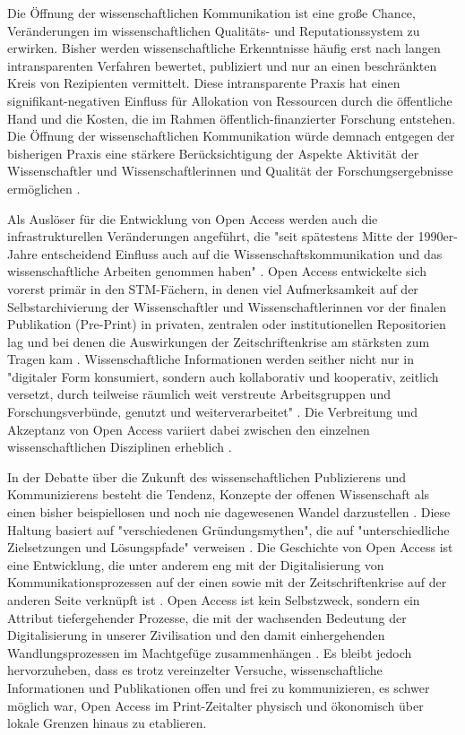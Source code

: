 Die Öffnung der wissenschaftlichen Kommunikation ist eine große Chance, Veränderungen im wissenschaftlichen Qualitäts- und Reputationssystem zu erwirken. Bisher werden wissenschaftliche Erkenntnisse häufig erst nach langen intransparenten Verfahren bewertet, publiziert und nur an einen beschränkten Kreis von Rezipienten vermittelt. Diese intransparente Praxis hat einen signifikant-negativen Einfluss für Allokation von Ressourcen durch die öffentliche Hand und die Kosten, die im Rahmen öffentlich-finanzierter Forschung entstehen. Die Öffnung der wissenschaftlichen Kommunikation würde demnach entgegen der bisherigen Praxis eine stärkere Berücksichtigung der Aspekte Aktivität der Wissenschaftler und Wissenschaftlerinnen und Qualität der Forschungsergebnisse ermöglichen \cite{Heise_2012b}.

Als Auslöser für die Entwicklung von Open Access werden auch die infrastrukturellen Veränderungen angeführt, die "seit spätestens Mitte der 1990er-Jahre entscheidend Einfluss auch auf die Wissenschaftskommunikation und das wissenschaftliche Arbeiten genommen haben" \cite{Schulze_2013}. Open Access entwickelte sich vorerst primär in den STM-Fächern, in denen viel Aufmerksamkeit auf der Selbstarchivierung der Wissenschaftler und Wissenschaftlerinnen vor der finalen Publikation (Pre-Print) in privaten, zentralen oder institutionellen Repositorien lag \cite{Adema_2013} und bei denen die Auswirkungen der Zeitschriftenkrise am stärksten zum Tragen kam \cite{Naeder_2010}. Wissenschaftliche Informationen werden seither nicht nur in "digitaler Form konsumiert, sondern auch kollaborativ und kooperativ, zeitlich versetzt, durch teilweise räumlich weit verstreute Arbeitsgruppen und Forschungsverbünde, genutzt und weiterverarbeitet" \cite{Schulze_2013}. Die Verbreitung und Akzeptanz von Open Access variiert dabei zwischen den einzelnen wissenschaftlichen Disziplinen erheblich \cite{Bernius_2009}.

In der Debatte über die Zukunft des wissenschaftlichen Publizierens und Kommunizierens besteht die Tendenz, Konzepte der offenen Wissenschaft als einen bisher beispiellosen und noch nie dagewesenen Wandel darzustellen \cite{Naeder_2010} \cite{Bjoerk_2010}. Diese Haltung basiert auf "verschiedenen Gründungsmythen", die auf "unterschiedliche Zielsetzungen und Lösungspfade" verweisen \cite[:7]{Hofmann_2016}. Die Geschichte von Open Access ist eine Entwicklung, die unter anderem eng mit der Digitalisierung von Kommunikationsprozessen auf der einen sowie mit der Zeitschriftenkrise auf der anderen Seite verknüpft ist \cite[:6]{Hofmann_2016} \cite{Yiotis_2005} \cite[:286]{Wein_2010}. Open Access ist kein Selbstzweck, sondern ein Attribut tiefergehender Prozesse, die mit der wachsenden Bedeutung der Digitalisierung in unserer Zivilisation und den damit einhergehenden Wandlungsprozessen im Machtgefüge zusammenhängen \cite{Hofmann_2014}. Es bleibt jedoch hervorzuheben, dass es trotz vereinzelter Versuche, wissenschaftliche Informationen und Publikationen offen und frei zu kommunizieren, es schwer möglich war, Open Access im Print-Zeitalter physisch und ökonomisch über lokale Grenzen hinaus zu etablieren.

